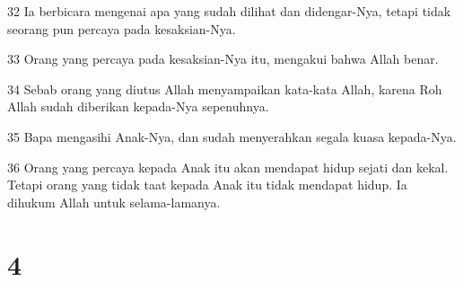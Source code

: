 \par 32 Ia berbicara mengenai apa yang sudah dilihat dan didengar-Nya, tetapi tidak seorang pun percaya pada kesaksian-Nya.
\par 33 Orang yang percaya pada kesaksian-Nya itu, mengakui bahwa Allah benar.
\par 34 Sebab orang yang diutus Allah menyampaikan kata-kata Allah, karena Roh Allah sudah diberikan kepada-Nya sepenuhnya.
\par 35 Bapa mengasihi Anak-Nya, dan sudah menyerahkan segala kuasa kepada-Nya.
\par 36 Orang yang percaya kepada Anak itu akan mendapat hidup sejati dan kekal. Tetapi orang yang tidak taat kepada Anak itu tidak mendapat hidup. Ia dihukum Allah untuk selama-lamanya.

\chapter{4}

